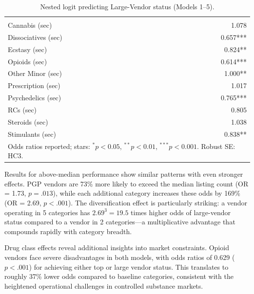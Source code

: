 \documentclass{article}
\begin{document}
\begin{table}[htbp]
\begin{tabular}{lrrrrr}
    \addlinespace
    \multicolumn{6}{l}{\emph{Secondary drug class}}\\
    Cannabis (sec)          &          &          &          &          & 1.078\\
    Dissociatives (sec)     &          &          &          &          & 0.657***\\
    Ecstasy (sec)           &          &          &          &          & 0.824**\\
    Opioids (sec)           &          &          &          &          & 0.614***\\
    Other Minor (sec)       &          &          &          &          & 1.000**\\
    Prescription (sec)      &          &          &          &          & 1.017\\
    Psychedelics (sec)      &          &          &          &          & 0.765***\\
    RCs (sec)               &          &          &          &          & 0.805\\
    Steroids (sec)          &          &          &          &          & 1.038\\
    Stimulants (sec)        &          &          &          &          & 0.838**\\
    \midrule
    \multicolumn{6}{l}{\footnotesize Odds ratios reported; stars: $^{*}p<0.05$, $^{**}p<0.01$, $^{***}p<0.001$. Robust SE: HC3.}\\
    \bottomrule
  \end{tabular}
  \caption{Nested logit predicting Large-Vendor status (Models 1–5).}
  \label{tab:logit_large_nested}
\end{table}


Results for above-median performance show similar patterns with even stronger effects. PGP vendors are 73\% more likely to exceed the median listing count (OR = 1.73, $p = .013$), while each additional category increases these odds by 169\% (OR = 2.69, $p < .001$). The diversification effect is particularly striking: a vendor operating in 5 categories has $2.69^3 = 19.5$ times higher odds of large-vendor status compared to a vendor in 2 categories—a multiplicative advantage that compounds rapidly with category breadth.

Drug class effects reveal additional insights into market constraints. Opioid vendors face severe disadvantages in both models, with odds ratios of 0.629 ($p < .001$) for achieving either top or large vendor status. This translates to roughly 37\% lower odds compared to baseline categories, consistent with the heightened operational challenges in controlled substance markets.
\end{document}
